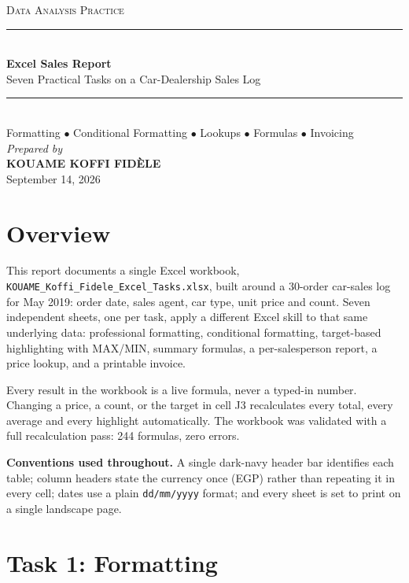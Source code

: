 \documentclass[12pt,a4paper]{article}
\newcommand{\F}[1]{\texttt{\small #1}}
\begin{document}
\begin{titlepage}\centering
\vspace*{3cm}
{\large\scshape Data Analysis Practice}\\[2.6cm]
\rule{\linewidth}{0.5pt}\\[0.8cm]
{\LARGE\bfseries Excel Sales Report}\\[0.6cm]
{\large Seven Practical Tasks on a Car-Dealership Sales Log}\\[0.8cm]
\rule{\linewidth}{0.5pt}\\[1.2cm]
{\normalsize Formatting $\bullet$ Conditional Formatting $\bullet$ Lookups $\bullet$
Formulas $\bullet$ Invoicing}\\[3.2cm]
{\large\itshape Prepared by}\\[0.5cm]
{\Large\bfseries KOUAME KOFFI FID\`ELE}\\[0.6cm]
{\large September 14, 2026}
\vfill\end{titlepage}

\tableofcontents
\newpage

\section{Overview}

This report documents a single Excel workbook,
\F{KOUAME\_Koffi\_Fidele\_Excel\_Tasks.xlsx}, built around a 30-order car-sales log
for May 2019: order date, sales agent, car type, unit price and count. Seven
independent sheets, one per task, apply a different Excel skill to that same
underlying data: professional formatting, conditional formatting, target-based
highlighting with MAX/MIN, summary formulas, a per-salesperson report, a price
lookup, and a printable invoice.

Every result in the workbook is a live formula, never a typed-in number. Changing a
price, a count, or the target in cell J3 recalculates every total, every average and
every highlight automatically. The workbook was validated with a full recalculation
pass: 244 formulas, zero errors.

\textbf{Conventions used throughout.} A single dark-navy header bar identifies each
table; column headers state the currency once (EGP) rather than repeating it in every
cell; dates use a plain \F{dd/mm/yyyy} format; and every sheet is set to print on a
single landscape page.

\section{Task 1: Formatting}
\end{document}
